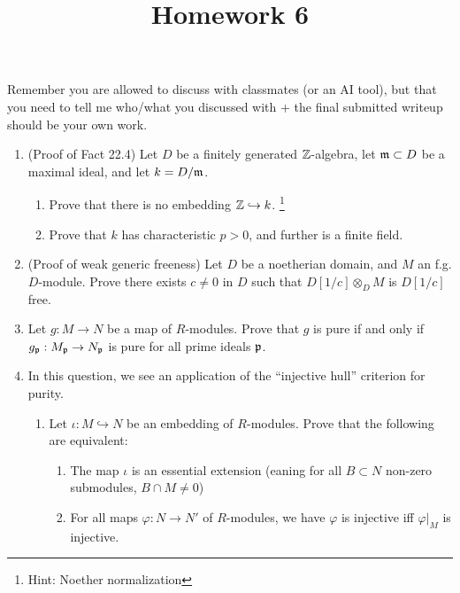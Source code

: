 \documentclass[11pt]{amsart}
\title{Homework 6}
\date{\vspace{-4em}}
\theoremstyle{definition}
\begin{document}
\maketitle\thispagestyle{fancy}

Remember you are allowed to discuss with classmates (or an AI tool), but that you need to tell me who/what you discussed with + the final submitted writeup should be your own work.


\begin{enumerate}[itemsep=5em]

\item (Proof of Fact 22.4) Let $D$ be a finitely generated $\mathbb{Z}$-algebra, let $\mathfrak{m}\subset D$ be a maximal ideal, and let $k=D/\mathfrak{m}$.  
\begin{enumerate}
\item Prove that there is no embedding $\mathbb{Z}\hookrightarrow k$.
\footnote{Hint: Noether normalization}


\item Prove that $k$ has characteristic $p>0$, and further is a finite field.


\end{enumerate}


\item (Proof of weak generic freeness) Let $D$ be a noetherian domain, and $M$ an f.g. $D$-module. Prove there exists $c\ne 0$ in $D$ such that $D[1/c]\otimes_D M$ is $D[1/c]$ free.



\item Let $g:M\to N$ be a map of $R$-modules. Prove that $g$ is pure if and only if $g_{\mathfrak{p}}:M_{\mathfrak{p}}\to N_{\mathfrak{p}}$ is pure for all prime ideals $\mathfrak{p}$.



\item In this question, we see an application of the ``injective hull'' criterion for purity. 
\begin{enumerate}[itemsep=1em]
\item Let $\iota : M\hookrightarrow N$ be an embedding of $R$-modules. Prove that the following are equivalent:
\begin{enumerate}
\item The map $\iota$ is an essential extension (eaning for all $B\subset N$ non-zero submodules, $B\cap M \neq 0$)
\item For all maps $\varphi:N\to N'$ of $R$-modules, we have $\varphi$ is injective iff $\varphi|_M$ is injective.
\end{enumerate}


\end{enumerate}
\end{enumerate}
\end{document}
